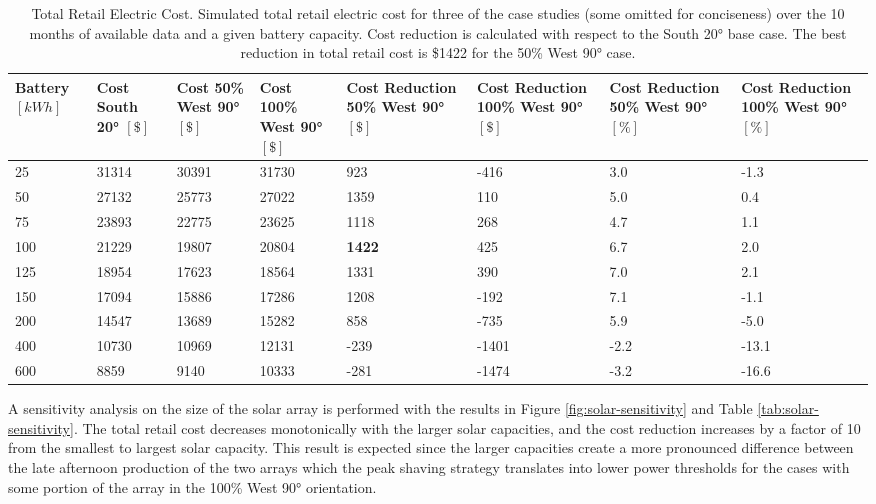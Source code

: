 \documentclass[journal,article,submit,pdftex,moreauthors]{Definitions/mdpi}
\begin{document}
\begin{table}[!h]
  \centering
  \caption{Total Retail Electric Cost. Simulated total
  retail electric cost for three of the case studies (some omitted for
  conciseness) over the 10 months of available data and a given battery
  capacity. Cost reduction is calculated with respect to the South 20°
  base case. The best reduction in total retail cost is \$1422 for the
  50\% West 90° case.}
  \label{tab:total-cost}
  \begin{tabularx}{\textwidth}{XXXXXXXX}
  \toprule
  Battery $[kWh]$ & Cost South 20° $[\$]$ & Cost 50\% West 90° $[\$]$  & Cost 100\% West 90° $[\$]$ & Cost Reduction 50\% West 90° $[\$]$ & Cost Reduction 100\% West 90° $[\$]$ & Cost Reduction 50\% West 90° $[\%]$ & Cost Reduction 100\% West 90° $[\%]$\\
  \midrule
  25              & 31314                                & 30391                      & 31730 & 923           & -416  & 3.0  & -1.3\\
  50              & 27132                                & 25773                      & 27022 & 1359          & 110   & 5.0  & 0.4\\
  75              & 23893                                & 22775                      & 23625 & 1118          & 268   & 4.7  & 1.1\\
  100             & 21229                                & 19807                      & 20804 & \textbf{1422} & 425   & 6.7  & 2.0\\
  125             & 18954                                & 17623                      & 18564 & 1331          & 390   & 7.0  & 2.1\\
  150             & 17094                                & 15886                      & 17286 & 1208          & -192  & 7.1  & -1.1\\
  200             & 14547                                & 13689                      & 15282 & 858           & -735  & 5.9  & -5.0\\
  400             & 10730                                & 10969                      & 12131 & -239          & -1401 & -2.2 & -13.1\\
  600             & 8859                                 & 9140                       & 10333 & -281          & -1474 & -3.2 & -16.6\\
  \bottomrule
  \end{tabularx}
\end{table}

A sensitivity analysis on the size of the solar array is performed with
the results in Figure \ref{fig:solar-sensitivity} and Table \ref{tab:solar-sensitivity}. The total retail cost decreases monotonically
with the larger solar capacities, and the cost reduction increases by a
factor of 10 from the smallest to largest solar capacity. This result is
expected since the larger capacities create a more pronounced difference
between the late afternoon production of the two arrays which the peak
shaving strategy translates into lower power thresholds for the cases
with some portion of the array in the 100\% West 90° orientation.
\end{document}
